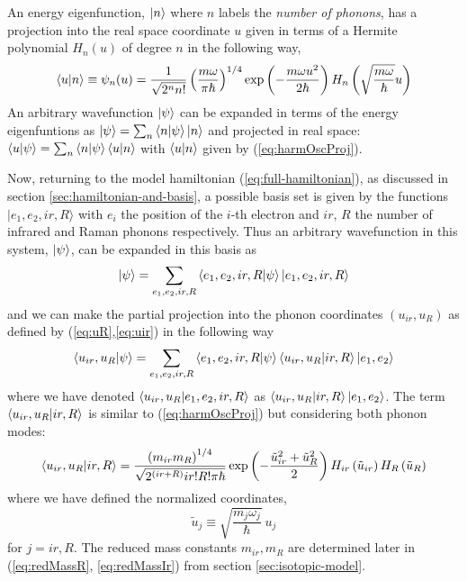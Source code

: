 An energy eigenfunction, $\left | n \right\rangle$ where $n$ labels the \textit{number of phonons}, has a projection into the real space coordinate $u$ given in terms of a Hermite polynomial $H_n(u)$ of degree $n$ in the following way,
%
\begin{equation}
  \label{eq:harmOscProj}
  \left\langle u|n\right\rangle 
  \equiv \psi_n(u) 
  = \frac{1}{\sqrt{2^n n!}} \left(\frac{m \omega}{\pi \hbar}\right)^{1/4}
  \exp\left(-\frac{m \omega u^2}{2 \hbar}\right) H_n\left( \sqrt{\frac{m \omega}{\hbar}} u \right) 
\end{equation}
%
An arbitrary wavefunction $\left | \psi \right\rangle$ can be expanded in terms of the energy eigenfuntions as $\left | \psi \right\rangle = \sum_n \left\langle n|\psi\right\rangle \left | n \right\rangle$ and projected in real space: $\left\langle u|\psi\right\rangle = \sum_n \left\langle n|\psi\right\rangle \left\langle u|n\right\rangle$ with $\left\langle u|n\right\rangle$ given by (\ref{eq:harmOscProj}).

Now, returning to the model hamiltonian (\ref{eq:full-hamiltonian}), as discussed in section \ref{sec:hamiltonian-and-basis}, a possible basis set is given by the functions ${| e_1, e_2, ir, R \rangle}$ with $e_i$ the position of the $i$-th electron and $ir$, $R$ the number of infrared and Raman phonons respectively. 
Thus an arbitrary wavefunction in this system, $\left | \psi \right\rangle$, can be expanded in this basis as
%
\begin{equation}
  \label{eq:wf-phonon-base}
  \left | \psi \right\rangle=\sum_{e_1,e_2,ir,R} \left\langle e_1,e_2,ir,R|\psi\right\rangle\left | e_1,e_2,ir,R \right\rangle
\end{equation}
%
and we can make the partial projection into the phonon coordinates $(u_{ir},u_R)$ as defined by (\ref{eq:uR},\ref{eq:uir}) in the following way
%
\begin{equation}
  \label{eq:wf-expansion}
  \left\langle u_{ir},u_R|\psi\right\rangle=\sum_{e_1,e_2,ir,R} \left\langle e_1,e_2,ir,R|\psi\right\rangle\left\langle u_{ir},u_R|ir,R\right\rangle\left | e_1,e_2 \right\rangle
\end{equation}
%
where we have denoted $\left\langle u_{ir},u_R|e_1,e_2,ir,R\right\rangle$ as $\left\langle u_{ir},u_R|ir,R\right\rangle\left | e_1,e_2 \right\rangle$. 
The term $\left\langle u_{ir},u_R|ir,R\right\rangle$ is similar to (\ref{eq:harmOscProj}) but considering both phonon modes:
%
\begin{equation}
  \label{eq:hermite-expansion}
  \left\langle u_{ir},u_R|ir,R\right\rangle  = \frac{\left(m_{ir}m_R\right)^{1/4}}{\sqrt{2^{(ir+R)} ir!R!\pi\hbar}}
  \exp\left(-\frac{\tilde{u}_{ir}^2 + \tilde{u}_R^2}{2}\right) 
  H_{ir}\left(\tilde{u}_{ir} \right)H_{R}\left(\tilde{u}_{R} \right)
\end{equation}
%
where we have defined the normalized coordinates,
%
\begin{equation}
  \label{eq:uTildeDef}
  \tilde{u}_j \equiv \sqrt{\frac{m_j\omega_j}{\hbar}}\ u_j
\end{equation}
%
for $j=ir,R$. 
The reduced mass constants $m_{ir},m_R$ are determined later in (\ref{eq:redMassR}, \ref{eq:redMassIr}) from section \ref{sec:isotopic-model}.


